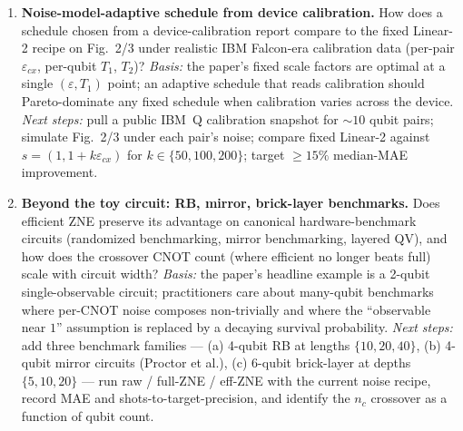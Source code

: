 \begin{enumerate}
\item \textbf{Noise-model-adaptive schedule from device calibration.}
How does a schedule chosen from a device-calibration report compare to
the fixed Linear-2 recipe on Fig.~2/3 under realistic IBM Falcon-era
calibration data (per-pair $\varepsilon_{cx}$, per-qubit $T_1$, $T_2$)?
\emph{Basis:} the paper's fixed scale factors are optimal at a single
$(\varepsilon, T_1)$ point; an adaptive schedule that reads calibration
should Pareto-dominate any fixed schedule when calibration varies across
the device.
\emph{Next steps:} pull a public IBM~Q calibration snapshot for $\sim 10$
qubit pairs; simulate Fig.~2/3 under each pair's noise; compare fixed
Linear-2 against $s = (1, 1 + k\varepsilon_{cx})$ for
$k \in \{50, 100, 200\}$; target $\ge 15\%$ median-MAE improvement.

\item \textbf{Beyond the toy circuit: RB, mirror, brick-layer benchmarks.}
Does efficient ZNE preserve its advantage on canonical hardware-benchmark
circuits (randomized benchmarking, mirror benchmarking, layered QV), and
how does the crossover CNOT count (where efficient no longer beats full)
scale with circuit width?
\emph{Basis:} the paper's headline example is a 2-qubit single-observable
circuit; practitioners care about many-qubit benchmarks where per-CNOT
noise composes non-trivially and where the ``observable near $1$''
assumption is replaced by a decaying survival probability.
\emph{Next steps:} add three benchmark families ---
(a) 4-qubit RB at lengths $\{10, 20, 40\}$,
(b) 4-qubit mirror circuits (Proctor et al.),
(c) 6-qubit brick-layer at depths $\{5, 10, 20\}$ ---
run raw / full-ZNE / eff-ZNE with the current noise recipe, record MAE
and shots-to-target-precision, and identify the $n_c$ crossover as a
function of qubit count.
\end{enumerate}
